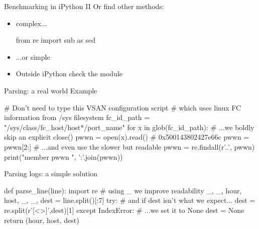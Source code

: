 \begin{pyframe}{Benchmarking in iPython II}
Or find other methods: 
\begin{itemize}
\item complex...
\begin{pycode}
from re import sub as sed
\end{pycode}
\item ...or simple
\begin{pycode}
\end{pycode}
\item Outside iPython check the  module
\end{itemize}
\end{pyframe}

%

\begin{pyframe}{Parsing: a real world Example}
\begin{pycode}
# Don't need to type this VSAN configuration script
#  which uses linux FC information from /sys filesystem
fc_id_path = "/sys/class/fc_host/host*/port_name"
for x in glob(fc_id_path):
    # ...we boldly skip an explicit close()
    pwwn = open(x).read()  # 0x500143802427e66c
    pwwn = pwwn[2:]
    # ...and even use the slower but readable
    pwwn = re.findall(r'..', pwwn)
    print("member pwwn ", ':'.join(pwwn))

\end{pycode}
\end{pyframe}

\begin{pyframe}{Parsing logs: a simple solution}
\begin{pycode}
def parse_line(line):
    import re
    # using _ we improve readability
    _, _, hour, host, _, _, dest = line.split()[:7]
    try:
        # and if dest isn't what we expect...
        dest = re.split(r'[<>]',dest)[1]
    except IndexError:
        # ...we set it to None
        dest = None
    return (hour, host, dest)
\end{pycode}
\end{pyframe}
